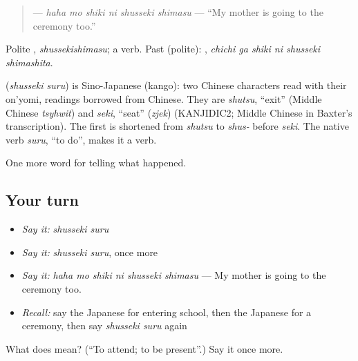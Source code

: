 \begin{quote}
\textbf{  } — \emph{haha mo shiki ni shusseki shimasu} — \textquotedblleft{}My mother is going to the ceremony too.\textquotedblright{}
\end{quote}

Polite \textbf{}, \emph{shussekishimasu}; a  verb. Past (polite): \textbf{  }, \emph{chichi ga shiki ni shusseki shimashita}.

\begin{cousinweb}
\textbf{} (\emph{shusseki suru}) is Sino-Japanese (kango): two Chinese characters read with their on'yomi, readings borrowed from Chinese. They are \emph{shutsu}, \textquotedblleft{}exit\textquotedblright{} (Middle Chinese \emph{tsyhwit}) and \emph{seki}, \textquotedblleft{}seat\textquotedblright{} (\emph{zjek}) (KANJIDIC2; Middle Chinese in Baxter's transcription). The first is shortened from \emph{shutsu} to \emph{shus-} before \emph{seki}. The native verb \emph{suru}, \textquotedblleft{}to do\textquotedblright{}, makes it a verb.
\end{cousinweb}

\begin{grammarlens}[title={What you've built}]
One more word for telling what happened.
\end{grammarlens}

\subsection*{Your turn}
\begin{itemize}
\raggedright
  \item \emph{Say it:} \emph{shusseki suru}
  \item \emph{Say it:} \emph{shusseki suru}, once more
  \item \emph{Say it:} \emph{haha mo shiki ni shusseki shimasu} — My mother is going to the ceremony too.
  \item \emph{Recall:} say the Japanese for entering school, then the Japanese for a ceremony, then say \emph{shusseki suru} again
\end{itemize}

\begin{tcolorbox}[breakable,colback=teal!4,colframe=teal!35!black,title={Before you move on}]
What does  mean? (\textquotedblleft{}To attend; to be present\textquotedblright{}.) Say it once more.
\end{tcolorbox}
